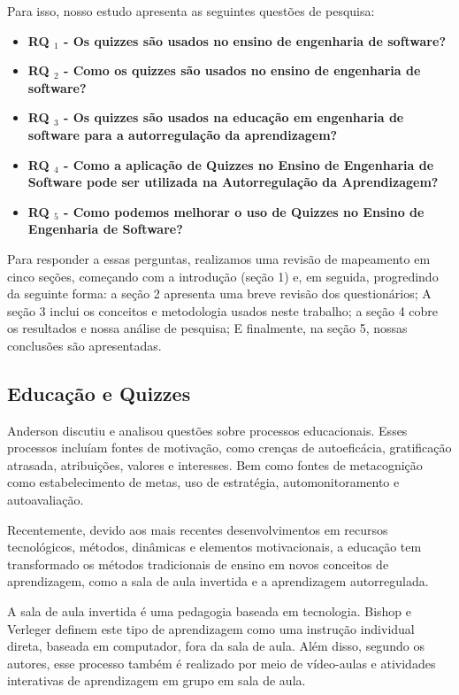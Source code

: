 Para isso, nosso estudo apresenta as seguintes questões de pesquisa:

\begin {itemize}
    \item\textbf {RQ $ _1 $ - Os quizzes são usados no ensino de engenharia de software?}
     \item\textbf {RQ $ _2 $ - Como os quizzes são usados no ensino de engenharia de software?}
     \item\textbf {RQ $ _3 $ - Os quizzes são usados na educação em engenharia de software para a autorregulação da aprendizagem?}
     \item\textbf {RQ $ _4 $ - Como a aplicação de Quizzes no Ensino de Engenharia de Software pode ser utilizada na Autorregulação da Aprendizagem?}
     \item\textbf {RQ $ _5 $ - Como podemos melhorar o uso de Quizzes no Ensino de Engenharia de Software?}
\end {itemize}

Para responder a essas perguntas, realizamos uma revisão de mapeamento em cinco seções, começando com a introdução (seção 1) e, em seguida, progredindo da seguinte forma: a seção 2 apresenta uma breve revisão dos questionários; A seção 3 inclui os conceitos e metodologia usados neste trabalho; a seção 4 cobre os resultados e nossa análise de pesquisa; E finalmente, na seção 5, nossas conclusões são apresentadas.

\subsection{Educação e Quizzes}

Anderson \cite{anderson_reflections_1984} discutiu e analisou questões sobre processos educacionais. Esses processos incluíam fontes de motivação, como crenças de autoeficácia, gratificação atrasada, atribuições, valores e interesses. Bem como fontes de metacognição como estabelecimento de metas, uso de estratégia, automonitoramento e autoavaliação.

Recentemente, devido aos mais recentes desenvolvimentos em recursos tecnológicos, métodos, dinâmicas e elementos motivacionais, a educação tem transformado os métodos tradicionais de ensino em novos conceitos de aprendizagem, como a sala de aula invertida e a aprendizagem autorregulada.

A sala de aula invertida é uma pedagogia baseada em tecnologia. Bishop e Verleger\cite {bishop_flipped_2013} definem este tipo de aprendizagem como uma instrução individual direta, baseada em computador, fora da sala de aula. Além disso, segundo os autores, esse processo também é realizado por meio de vídeo-aulas e atividades interativas de aprendizagem em grupo em sala de aula.

